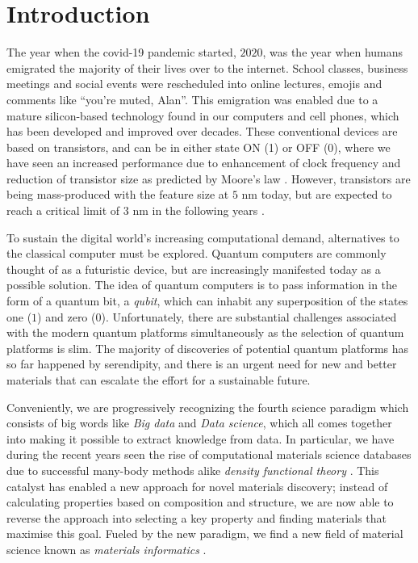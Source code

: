 \chapter{Introduction}

The year when the covid-19 pandemic started, $2020$, was the year when humans emigrated the majority of their lives over to the internet. School classes, business meetings and social events were rescheduled into online lectures, emojis and comments like ``you're muted, Alan''. This emigration was enabled due to a mature silicon-based technology found in our computers and cell phones, which has been developed and improved over decades. These conventional devices are based on transistors, and can be in either state ON (1) or OFF (0), where we have seen an increased performance due to enhancement of clock frequency and reduction of transistor size as predicted by Moore's law \cite{Moore1965, Pavicic2006}. However, transistors are being mass-produced with the feature size at $5$ nm today, but are expected to reach a critical limit of $3$ nm in the following years \cite{Gwennap2020}.



To sustain the digital world's increasing computational demand, alternatives to the classical computer must be explored. Quantum computers are commonly thought of as a futuristic device, but are increasingly manifested today as a possible solution. The idea of quantum computers is to pass information in the form of a quantum bit, a \textit{qubit}, which can inhabit any superposition of the states one ($1$) and zero ($0$). Unfortunately, there are substantial challenges associated with the modern quantum platforms simultaneously as the selection of quantum platforms is slim. The majority of discoveries of potential quantum platforms has so far happened by serendipity, and there is an urgent need for new and better materials that can escalate the effort for a sustainable future.

Conveniently, we are progressively recognizing the fourth science paradigm which consists of big words like \textit{Big data} and \textit{Data science}, which all comes together into making it possible to extract knowledge from data. In particular, we have during the recent years seen the rise of computational materials science databases \cite{Curtarolo2012, Curtarolo2012a, Calderon2015, Jain2013, Jain2016, Jain2018, Saal2013, Kirklin2015, Choudhary2020, Allen1987} due to successful many-body methods alike \textit{density functional theory} \cite{Kohn1965}. This catalyst has enabled a new approach for novel materials discovery; instead of calculating properties based on composition and structure, we are now able to reverse the approach into selecting a key property and finding materials that maximise this goal.
Fueled by the new paradigm, we find a new field of material science known as \textit{materials informatics} \cite{Rajan2005}.

